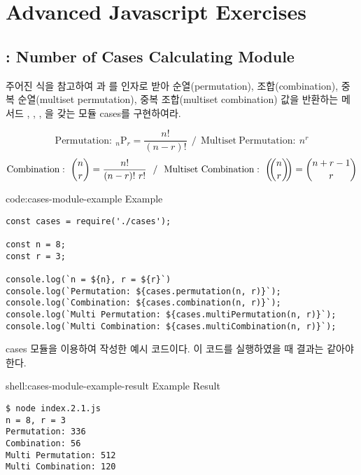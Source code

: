 \section{Advanced Javascript Exercises}\label{sect:advanced-javascript-exercises}

\subsection*{: Number of Cases Calculating Module}

주어진 식을 참고하여 과 를 인자로 받아 순열(permutation), 조합(combination), 중복 순열(multiset permutation), 중복 조합(multiset combination) 값을 반환하는 메서드 , , , 을 갖는 모듈 cases를 구현하여라.

$$ \mathrm{Permutation}:~{}_n\mathrm{P}_r = \frac{n!}{(n-r)!}~~/~~\mathrm{Multiset~Permutation}:~n^r $$
$$ \mathrm{Combination}:~\binom{n}{r} = \frac{n!}{(n-r)!~r!}~~/~~\mathrm{Multiset~Combination}:~\left(\kern-.3em\binom{n}{r}\kern-.3em\right) = \binom{n+r-1}{r} $$

\begin{codeenv}{code:cases-module-example}{ Example}\begin{verbatim}
const cases = require('./cases');

const n = 8;
const r = 3;

console.log(`n = ${n}, r = ${r}`)
console.log(`Permutation: ${cases.permutation(n, r)}`);
console.log(`Combination: ${cases.combination(n, r)}`);
console.log(`Multi Permutation: ${cases.multiPermutation(n, r)}`);
console.log(`Multi Combination: ${cases.multiCombination(n, r)}`);
\end{verbatim}
\end{codeenv}

\은 cases 모듈을 이용하여 작성한 예시 코드이다. 이 코드를 실행하였을 때 결과는 \와 같아야 한다.

\begin{shellenv}{shell:cases-module-example-result}{ Example Result}\begin{verbatim}
$ node index.2.1.js
n = 8, r = 3
Permutation: 336
Combination: 56
Multi Permutation: 512
Multi Combination: 120
\end{verbatim}
\end{shellenv}
\clearpage

